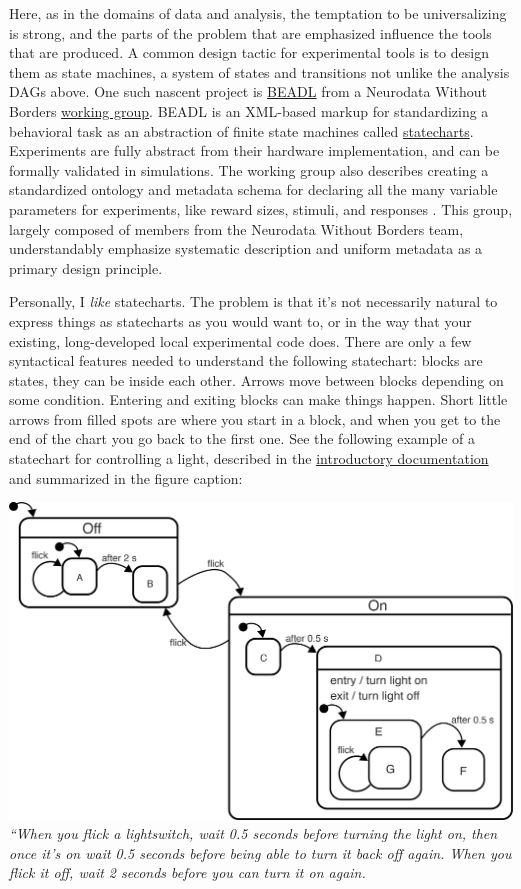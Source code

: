 \documentclass[notoc]{tufte-book}
\begin{document}
Here, as in the domains of data and analysis, the temptation to be
universalizing is strong, and the parts of the problem that are
emphasized influence the tools that are produced. A common design tactic
for experimental tools is to design them as state machines, a system of
states and transitions not unlike the analysis DAGs above. One such
nascent project is
\href{https://archive.org/details/beadl-xml-documentation-v-0.1/mode/2up}{BEADL}
\citep{wulfBEADLXMLDocumentation2020}  from a Neurodata Without
Borders
\href{https://archive.org/details/nwb-behavioral-task-wg}{working
group}. BEADL is an XML-based markup for standardizing a behavioral task
as an abstraction of finite state machines called
\href{https://statecharts.github.io/}{statecharts}. Experiments are
fully abstract from their hardware implementation, and can be formally
validated in simulations. The working group also describes creating a
standardized ontology and metadata schema for declaring all the many
variable parameters for experiments, like reward sizes, stimuli, and
responses \citep{nwbbehavioraltaskwgNWBBehavioralTask2020} . This
group, largely composed of members from the Neurodata Without Borders
team, understandably emphasize systematic description and uniform
metadata as a primary design principle.

Personally, I \emph{like} statecharts. The problem is that it's not
necessarily natural to express things as statecharts as you would want
to, or in the way that your existing, long-developed local experimental
code does. There are only a few syntactical features needed to
understand the following statechart: blocks are states, they can be
inside each other. Arrows move between blocks depending on some
condition. Entering and exiting blocks can make things happen. Short
little arrows from filled spots are where you start in a block, and when
you get to the end of the chart you go back to the first one. See the
following example of a statechart for controlling a light, described in
the \href{https://statecharts.dev/on-off-statechart.html}{introductory
documentation} and summarized in the figure caption:

\includegraphics[width=\linewidth]{../assets/images/on-off-delayed-exit-1.png}
\emph{``When you flick a lightswitch, wait 0.5 seconds before turning
the light on, then once it's on wait 0.5 seconds before being able to
turn it back off again. When you flick it off, wait 2 seconds before you
can turn it on again.}
\end{document}
